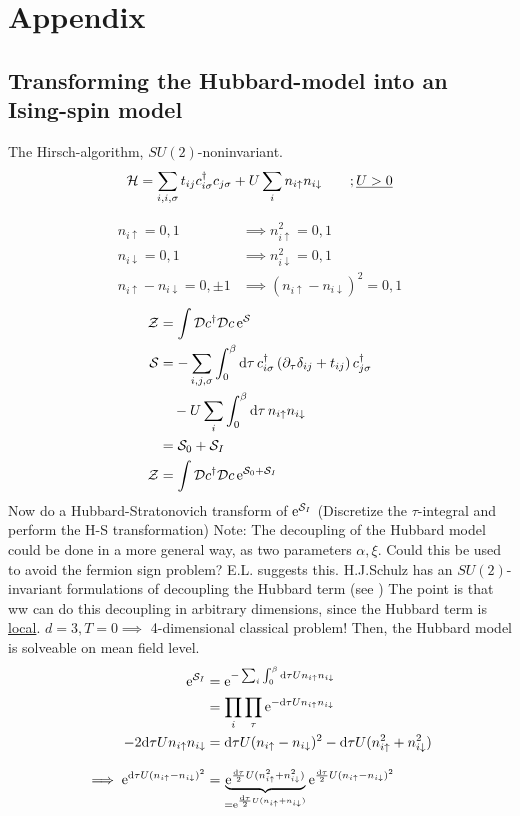 \section{Appendix}
\subsection[Hubbard model to Ising spin.]{Transforming the Hubbard-model into an Ising-spin model}
\cite{von1992quantum} The Hirsch-algorithm, $SU(2)$-noninvariant.
\begin{equation}
\mathcal{H} = \sum_{i,i,\sigma}t_{ij}c_{i\sigma}^\dagger c_{j\sigma} + U\sum_in_{i\uparrow}n_{i\downarrow} \qquad ; \underline{U>0}
\end{equation}

\begin{align*}
n_{i\uparrow} = 0,1 &\implies n_{i\uparrow}^2 = 0,1 \\
n_{i\downarrow} = 0,1 &\implies n_{i\downarrow}^2 = 0,1 \\
n_{i\uparrow}-n_{i\downarrow} = 0,\pm 1&\implies (n_{i\uparrow}-n_{i\downarrow})^2 = 0,1
\end{align*}
\begin{align*}
\mathcal{Z} &= \int\mathcal{D} c^\dagger\mathcal{D} c\,\mathrm{e}^{\mathcal{S}} \\
\mathcal{S} &= -\sum_{i,j,\sigma}\int_0^\beta\dd\tau\, c_{i\sigma}^\dagger\left(\partial_\tau\delta_{ij}+t_{ij}\right)c_{j\sigma}^\dagger \\
& \quad - U\sum_i\int_0^\beta\dd\tau\, n_{i\uparrow}n_{i\downarrow}\\
&= \mathcal{S}_0 + \mathcal{S}_I \\
\mathcal{Z} &= \int\mathcal{D} c^\dagger\mathcal{D} c\,\mathrm{e}^{\mathcal{S}_0+\mathcal{S}_I}
\end{align*}
Now do a Hubbard-Stratonovich transform of \(\mathrm{e}^{\mathcal{S}_I}\) (Discretize the \(\tau\)-integral and perform the H-S transformation)
Note: The decoupling of the Hubbard model could be done in a more general way, as two parameters \(\alpha, \xi\). Could this be used to avoid the fermion sign problem? E.L. suggests this. H.J.Schulz has an \(SU(2)\)-invariant formulations of decoupling the Hubbard term (see \cite{weng1991path, schulz1990effective}) The point is that ww can do this decoupling in arbitrary dimensions, since the Hubbard term is \underline{local}. \(d = 3, T=0\implies\) 4-dimensional classical problem! Then, the Hubbard model is solveable on mean field level. 
\begin{align*}
\mathrm{e}^{\mathcal{S}_I} &= \mathrm{e}^{-\sum_i\int_0^\beta\dd \tau Un_{i\uparrow}n_{i\downarrow}}\\
&= \prod_i\prod_\tau\mathrm{e}^{-\dd\tau Un_{i\uparrow}n_{i\downarrow}} \\
-2\dd\tau Un_{i\uparrow}n_{i\downarrow} &= \dd\tau U(n_{i\uparrow}-n_{i\downarrow})^2 - \dd\tau U(n_{i\uparrow}^2+n_{i\downarrow}^2) \\[2ex]
\implies \mathrm{e}^{\dd\tau U(n_{i\uparrow}-n_{i\downarrow})^2} &= \underbrace{\mathrm{e}^{\frac{\dd\tau}{2}U(n_{i\uparrow}^2+n_{i\downarrow}^2)}}_{=\mathrm{e}^{\frac{\dd\tau}{2}U(n_{i\uparrow}+n_{i\downarrow})}}\mathrm{e}^{\frac{\dd\tau}{2}U(n_{i\uparrow}-n_{i\downarrow})^2}
\end{align*}
